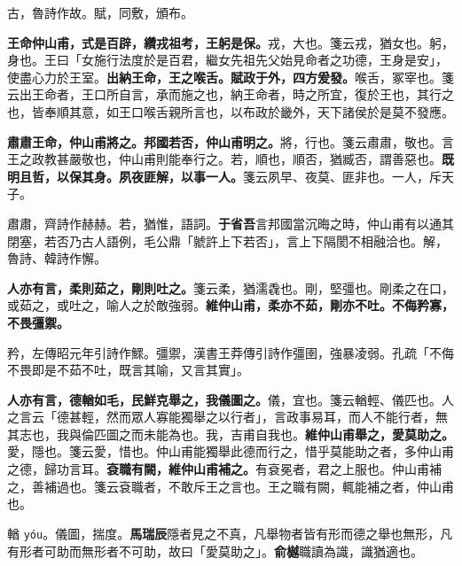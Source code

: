 \begin{quoting}古，魯詩作故。賦，同敷，頒布。\end{quoting}

\textbf{王命仲山甫，式是百辟，纘戎祖考，王躬是保。}{\footnotesize 戎，大也。箋云戎，猶女也。躬，身也。王曰「女施行法度於是百君，繼女先祖先父始見命者之功德，王身是安」，使盡心力於王室。}\textbf{出納王命，王之喉舌。賦政于外，四方爰發。}{\footnotesize 喉舌，冢宰也。箋云出王命者，王口所自言，承而施之也，納王命者，時之所宜，復於王也，其行之也，皆奉順其意，如王口喉舌親所言也，以布政於畿外，天下諸侯於是莫不發應。}

\textbf{肅肅王命，仲山甫將之。邦國若否，仲山甫明之。}{\footnotesize 將，行也。箋云肅肅，敬也。言王之政教甚嚴敬也，仲山甫則能奉行之。若，順也，順否，猶臧否，謂善惡也。}\textbf{既明且哲，以保其身。夙夜匪解，以事一人。}{\footnotesize 箋云夙早、夜莫、匪非也。一人，斥天子。}

\begin{quoting}肅肅，齊詩作赫赫。若，猶惟，語詞。\textbf{于省吾}言邦國當沉晦之時，仲山甫有以通其閉塞，若否乃古人語例，毛公鼎「虩許上下若否」，言上下隔閡不相融洽也。解，魯詩、韓詩作懈。\end{quoting}

\textbf{人亦有言，柔則茹之，剛則吐之。}{\footnotesize 箋云柔，猶濡毳也。剛，堅彊也。剛柔之在口，或茹之，或吐之，喻人之於敵強弱。}\textbf{維仲山甫，柔亦不茹，剛亦不吐。不侮矜寡，不畏彊禦。}

\begin{quoting}矜，左傳昭元年引詩作鰥。彊禦，漢書王莽傳引詩作彊圉，強暴凌弱。孔疏「不侮不畏即是不茹不吐，既言其喻，又言其實」。\end{quoting}

\textbf{人亦有言，德輶如毛，民鮮克舉之，我儀圖之。}{\footnotesize 儀，宜也。箋云輶輕、儀匹也。人之言云「德甚輕，然而眾人寡能獨舉之以行者」，言政事易耳，而人不能行者，無其志也，我與倫匹圖之而未能為也。我，吉甫自我也。}\textbf{維仲山甫舉之，愛莫助之。}{\footnotesize 愛，隱也。箋云愛，惜也。仲山甫能獨舉此德而行之，惜乎莫能助之者，多仲山甫之德，歸功言耳。}\textbf{袞職有闕，維仲山甫補之。}{\footnotesize 有袞冕者，君之上服也。仲山甫補之，善補過也。箋云袞職者，不敢斥王之言也。王之職有闕，輒能補之者，仲山甫也。}

\begin{quoting}輶 \texttt{yóu}。儀圖，揣度。\textbf{馬瑞辰}隱者見之不真，凡舉物者皆有形而德之舉也無形，凡有形者可助而無形者不可助，故曰「愛莫助之」。\textbf{俞樾}職讀為識，識猶適也。\end{quoting}

